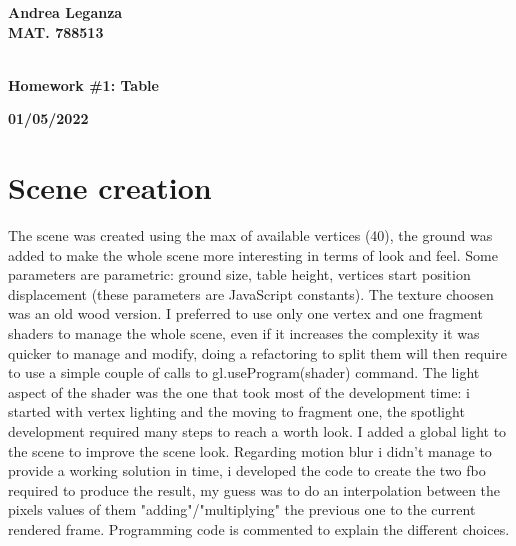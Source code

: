 \documentclass[10pt,a4paper]{article}
\begin{document}
\begin{titlepage}
\vspace{15mm}
\begin{center}
{\LARGE{\bf Andrea Leganza}}\\
\vspace{3mm}
{\LARGE{\bf MAT. 788513}}\\
\vspace{3mm}
{\LARGE{\bf\ }}\\
\end{center}
\vspace{40mm}
\par
\noindent
\begin{minipage}[t]{0.47\textwidth}
{\large{\bf}}
\end{minipage}
\hfill
\begin{center}
{\large{\bf Homework \#1: Table }}
\end{center}
\vspace{20mm}
\begin{center}
{\large{\bf 01/05/2022}}
\end{center}
\end{titlepage}
\pagebreak


\section{Scene creation}
The scene was created using the max of available vertices (40), the ground was added to make the whole scene more interesting in terms of look and feel. Some parameters are parametric: ground size, table height, vertices start position displacement (these parameters are JavaScript constants). The texture choosen was an old wood version. I preferred to use only one vertex and one fragment shaders to manage the whole scene, even if it increases the complexity it was quicker to manage and modify, doing a refactoring to split them will then require to use a simple couple of calls to gl.useProgram(shader) command. The light aspect of the shader was the one that took most of the development time: i started with vertex lighting and the moving to fragment one, the spotlight development required many steps to reach a worth look. I added a global light to the scene to improve the scene look. Regarding motion blur i didn't manage to provide a working solution in time, i developed the code to create the two fbo required to produce the result, my guess was to do an interpolation between the pixels values of them "adding"/"multiplying" the previous one to the current rendered frame. Programming code is commented to explain the different choices.
\end{document}
